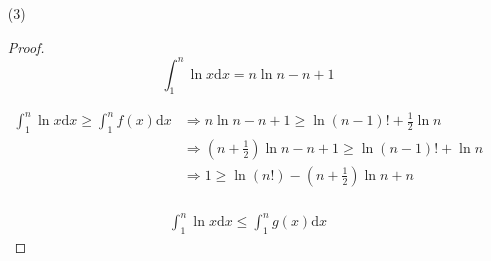 \documentclass{article}
\begin{document}
\begin{enumerate}
\begin{enumerate}
\begin{proof}[解]
\begin{equation}
\begin{aligned}
                    &=\ln(n-1)!+\frac{1}{2}\ln n \\
                \end{aligned}
                \nonumber
            \end{equation} \par
            \begin{equation}
                \begin{aligned}
                    \int_{1}^{n}g(x)\mathrm{d}x
                    &=\sum_{m=2}^{n-1}\int_{m-\frac{1}{2}}^{m+\frac{1}{2}}\left(\frac{x}{m}+\ln m-1\right)\mathrm{d}x+\int_{1}^{\frac{3}{2}}\left(\frac{x-1}{1}+\ln 1\right)\mathrm{d}x+\int_{n-\frac{1}{2}}^{n}\left(\frac{x-n}{n}+\ln n\right)\mathrm{d}x \\
                    &=\sum_{m=2}^{n-1}\ln m +\frac{1}{2}\ln n+\frac{n-1}{8n} \\
                    &=\ln(n-1)!+\frac{1}{2}\ln n+\frac{n-1}{8n} \\
                \end{aligned}
                \nonumber
            \end{equation} \par
        \end{proof}
        \item[(3)] \begin{proof}
            \begin{equation}
                \int_{1}^{n}\ln x\mathrm{d}x=n\ln n-n+1
                \nonumber
            \end{equation} \par
            \begin{equation}
                \begin{aligned}
                    \int_{1}^{n}\ln x\mathrm{d}x\geq\int_{1}^{n}f(x)\mathrm{d}x
                    &\Rightarrow n\ln n-n+1\geq\ln(n-1)!+\frac{1}{2}\ln n \\
                    &\Rightarrow \left(n+\frac{1}{2}\right)\ln n-n+1\geq\ln(n-1)!+\ln n \\
                    &\Rightarrow 1\geq\ln (n!)-\left(n+\frac{1}{2}\right)\ln n+n \\
                \end{aligned}
                \nonumber
            \end{equation} \par
            \begin{equation}
                \begin{aligned}
                    \int_{1}^{n}\ln x\mathrm{d}x\leq\int_{1}^{n}g(x)\mathrm{d}x

\end{aligned}
\end{equation}
\end{proof}
\end{enumerate}
\end{enumerate}
\end{document}
